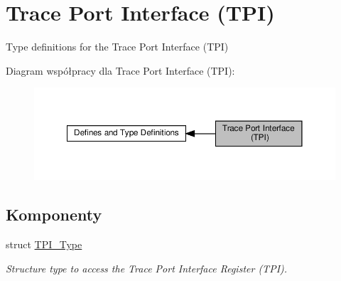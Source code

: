 \hypertarget{group___c_m_s_i_s___t_p_i}{}\section{Trace Port Interface (T\+PI)}
\label{group___c_m_s_i_s___t_p_i}


Type definitions for the Trace Port Interface (T\+PI)  


Diagram współpracy dla Trace Port Interface (T\+PI)\+:\nopagebreak
\begin{figure}[H]
\begin{center}
\leavevmode
\includegraphics[width=350pt]{group___c_m_s_i_s___t_p_i}
\end{center}
\end{figure}
\subsection*{Komponenty}
\begin{DoxyCompactItemize}
\item 
struct \hyperlink{struct_t_p_i___type}{T\+P\+I\+\_\+\+Type}
\begin{DoxyCompactList}\small\item\em Structure type to access the Trace Port Interface Register (T\+PI). \end{DoxyCompactList}\end{DoxyCompactItemize}
